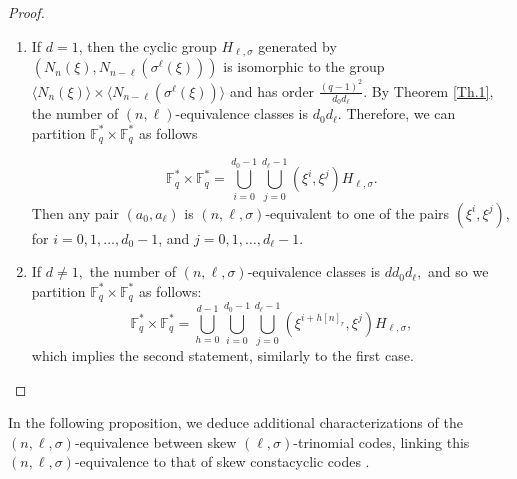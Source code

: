 \documentclass[12pt,paper]{article}
\theoremstyle{plain}
\newcommand{\Fq}{\mathbb{F}_{q}}
\begin{document}
\begin{proof}
\begin{enumerate}
    \item  If $ d = 1 $, then the cyclic group $ H_{\ell,\sigma} $ generated by $ \left( N_n(\xi), N_{n-\ell}(\sigma^{\ell}(\xi))\right) $ is isomorphic to the group $ \langle  N_n(\xi) \rangle \times \langle N_{n-\ell}(\sigma^{\ell}(\xi)) \rangle $ and has order $ \frac{(q-1)^2}{d_0 d_{\ell}} $. By Theorem \ref{Th.1}, the number of $ (n, \ell) $-equivalence classes is $ d_0 d_{\ell} $. Therefore, we can partition $ \Fq^* \times \Fq^* $ as follows

$$
\Fq^* \times \Fq^* =  \bigcup_{i=0}^{d_0-1} \bigcup_{j=0}^{d_{\ell}-1} (\xi^i, \xi^j) H_{\ell,\sigma}.
$$
Then any pair $(a_0,a_{\ell})$ is $(n,\ell,\sigma)$-equivalent to one of the pairs   $(\xi^i, \xi^j), $ for  $i=0,1,\ldots, d_0-1$, and  $j=0,1,\ldots, d_{\ell}-1$.
 \item 
 If $d\neq 1, $ the number of  $(n,\ell,\sigma)$-equivalence classes is $ d d_0 d_{\ell} ,$ and so we partition $ \Fq^* \times \Fq^* $ as follows:
$$  \Fq^{*}\times \Fq^{*} = \bigcup_{h=0}^{d-1}  \bigcup_{i=0}^{d_0-1} \bigcup_{j=0}^{d_{\ell}-1} (\xi^{i+h[n]_r} ,\xi^{j}) H_{\ell,\sigma}, $$
which implies the second statement, similarly to the first case.
\end{enumerate}
  
  
 
\end{proof} 


In the following proposition, we deduce additional characterizations of the $(n,\ell,\sigma)$-equivalence between skew $(\ell,\sigma)$-trinomial codes, linking this $(n,\ell,\sigma)$-equivalence to that of skew  constacyclic codes \cite{Ouazzou2025,Boulanouar2021,Lobillo2025}. 
\end{document}
